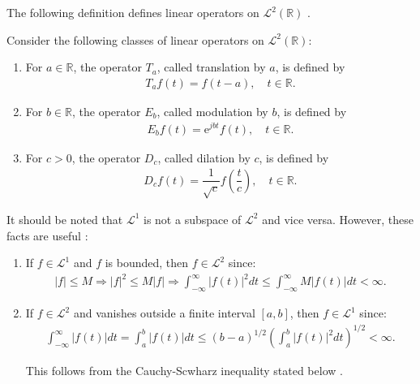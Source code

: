 The following definition defines linear operators on $\mathcal{L}^2(\mathbb{R})$ \cite{page 120, FSE2010}.

\begin{definition} \label{def:TMD}
Consider the following classes of linear operators on $\mathcal{L}^2(\mathbb{R})$:
\begin{enumerate}
\item For $a \in \mathbb{R}$, the operator $T_a$, called translation by $a$, is defined by
\begin{align*}
T_a f(t) = f(t-a), \quad t \in \mathbb{R}.
\end{align*}

\item For $b \in \mathbb{R}$, the operator $E_b$, called modulation by $b$, is defined by
\begin{align*}
E_b f(t) = \text{e}^{j b t} f(t), \quad t \in \mathbb{R}.
\end{align*}

\item For $c > 0$, the operator $D_c$, called dilation by $c$, is defined by
\begin{align*}
D_c f(t) = \dfrac{1}{\sqrt{c}} f\left( \dfrac{t}{c} \right), \quad t \in \mathbb{R}.
\end{align*}
\end{enumerate}
\end{definition}

It should be noted that $\mathcal{L}^1$ is not a subspace of $\mathcal{L}^2$ and vice versa. However, these facts are useful \cite{page 205, FAA}:
\begin{enumerate}
\item If $f \in \mathcal{L}^1$ and $f$ is bounded, then $f \in \mathcal{L}^2$ since:
\begin{align*}
|f| \leq M \Rightarrow |f|^2 \leq M|f| \Rightarrow \int_{-\infty}^\infty |f(t)|^2 dt \leq \int_{-\infty}^\infty M|f(t)| dt < \infty.
\end{align*}

\item If $f \in \mathcal{L}^2$ and vanishes outside a finite interval $[a,b]$, then $f \in \mathcal{L}^1$ since:
\begin{align*}
\int_{-\infty}^\infty |f(t)| dt = \int_a^b |f(t)| dt \leq (b - a)^{1/2} \left( \int_a^b |f(t)|^2 dt \right)^{1/2} < \infty.
\end{align*}

This follows from the Cauchy-Scwharz inequality stated below \cite{page 118, FSE2010}.
\end{enumerate}


